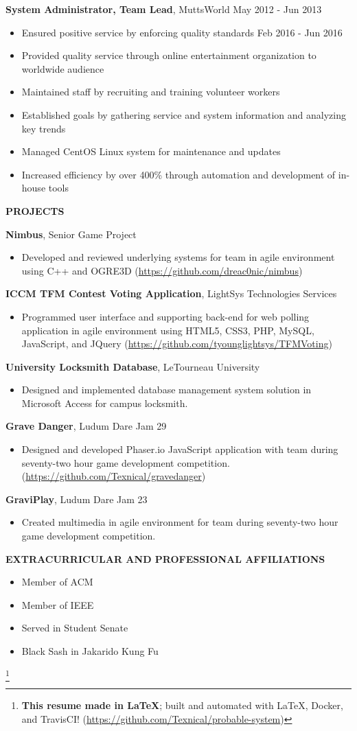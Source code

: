 \documentclass[letterpaper]{article}
\newcommand{\altsection}[1]{\noindent\textbf{#1}\smallskip}
\newcommand{\entry}[3]{\textbf{#1}, #2\begin{itemize}[leftmargin=3.5em]#3\end{itemize}\bigskip}
\newcommand\eol[1]{%
    \begingroup
    \renewcommand\thefootnote{}\footnote{#1}%
    \addtocounter{footnote}{-1}%
    \endgroup
}
\begin{document}
\entry{System Administrator, Team Lead}{MuttsWorld                             \hfill          May 2012 - Jun 2013}  {
    \item Ensured positive service by enforcing quality standards       \hfill          Feb 2016 - Jun 2016
    \item Provided quality service through online entertainment organization to worldwide audience
    \item Maintained staff by recruiting and training volunteer workers
    \item Established goals by gathering service and system information and analyzing key trends
    \item Managed CentOS Linux system for maintenance and updates
    \item Increased efficiency by over 400\% through automation and development of in-house tools
}

\altsection{PROJECTS}

\entry{Nimbus}{Senior Game Project} {
    \item Developed and reviewed underlying systems for team in agile environment using C++ and OGRE3D (\url{https://github.com/dreac0nic/nimbus})
}

\entry{ICCM TFM Contest Voting Application}{LightSys Technologies Services} {
    \item Programmed user interface and supporting back-end for web polling application in agile environment using HTML5, CSS3, PHP, MySQL, JavaScript, and JQuery (\url{https://github.com/tyounglightsys/TFMVoting})
}

\entry{University Locksmith Database}{LeTourneau University} {
    \item Designed and implemented database management system solution in Microsoft Access for campus locksmith.
}

\entry{Grave Danger}{Ludum Dare Jam 29} {
    \item Designed and developed Phaser.io JavaScript application with team during seventy-two hour game development competition. (\url{https://github.com/Texnical/gravedanger})
}

\entry{GraviPlay}{Ludum Dare Jam 23} {
    \item Created multimedia in agile environment for team during seventy-two hour game development competition.
}

\altsection{EXTRACURRICULAR AND PROFESSIONAL AFFILIATIONS}

\begin{multicols}{2}
\begin{itemize}[leftmargin=3.5em]
\item Member of ACM
\item Member of IEEE
\item Served in Student Senate
\item Black Sash in Jakarido Kung Fu
\end{itemize}
\end{multicols}

\eol{\noindent\textbf{This resume made in \LaTeX{}}; built and automated with \LaTeX{}, Docker, and TravisCI! (\url{https://github.com/Texnical/probable-system})}
\end{document}
